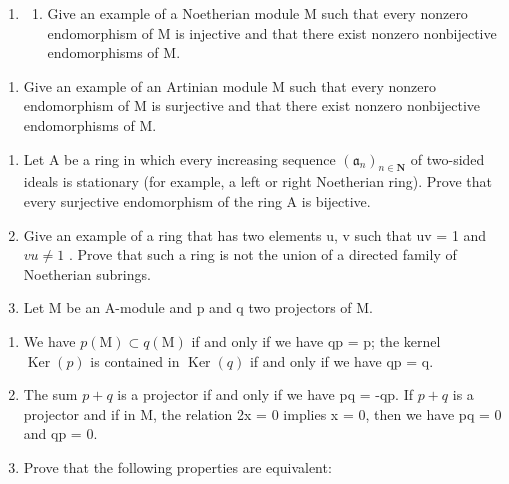 
\begin{enumerate}
\def\labelenumi{\arabic{enumi})}
\tightlist
\item
  \begin{enumerate}
  \def\labelenumii{\alph{enumii})}
  \tightlist
  \item
    Give an example of a Noetherian module M such that every nonzero endomorphism of M is injective and that there exist nonzero nonbijective endomorphisms of M.
  \end{enumerate}
\end{enumerate}

\begin{enumerate}
\def\labelenumi{\alph{enumi})}
\setcounter{enumi}{1}
\tightlist
\item
  Give an example of an Artinian module M such that every nonzero endomorphism of M is surjective and that there exist nonzero nonbijective endomorphisms of M.
\end{enumerate}

\begin{enumerate}
\def\labelenumi{\arabic{enumi})}
\setcounter{enumi}{1}
\item
  Let \(\mathrm{A}\) be a ring in which every increasing sequence \((\mathfrak{a}_n)_{n\in \mathbf{N}}\) of two-sided ideals is stationary (for example, a left or right Noetherian ring). Prove that every surjective endomorphism of the ring \(\mathrm{A}\) is bijective.
\item
  Give an example of a ring that has two elements u, v such that uv = 1 and \(vu \neq 1\) . Prove that such a ring is not the union of a directed family of Noetherian subrings.
\item
  Let M be an A-module and p and q two projectors of M.
\end{enumerate}

\begin{enumerate}
\def\labelenumi{\alph{enumi})}
\item
  We have \(p(\mathrm{M}) \subset q(\mathrm{M})\) if and only if we have qp = p; the kernel \(\operatorname{Ker}(p)\) is contained in \(\operatorname{Ker}(q)\) if and only if we have qp = q.
\item
  The sum \(p + q\) is a projector if and only if we have pq = -qp. If \(p + q\) is a projector and if in M, the relation 2x = 0 implies x = 0, then we have pq = 0 and qp = 0.
\item
  Prove that the following properties are equivalent:
\end{enumerate}

